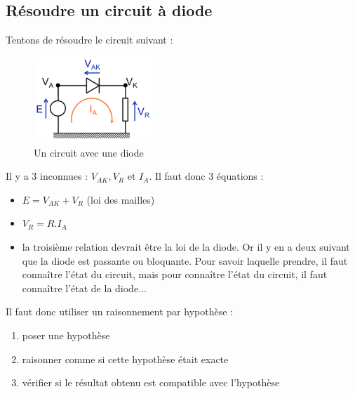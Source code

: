 \documentclass[a4paper]{article}
\begin{document}
    \subsection{Résoudre un circuit à diode}
    Tentons de résoudre le circuit suivant :
    \begin{figure}[H]
        \begin{center}
            \includegraphics[width=0.4\textwidth]{fig/5_circuitdiode.png}
            \caption{Un circuit avec une diode}
            \label{fig:5_circuitdiode}
        \end{center}
    \end{figure}
    Il y a 3 inconnues : $V_{AK}, V_R$ et $I_A$. Il faut donc 3 équations :
    \begin{itemize}
        \item $E = V_{AK}+V_R$ (loi des mailles)
        \item $V_R = R.I_A$
        \item la troisième relation devrait être la loi de la diode. Or il y en a 
        deux suivant que la diode est passante ou bloquante. Pour savoir laquelle
        prendre, il faut connaître l'état du circuit, mais pour connaître l'état
        du circuit, il faut connaître l'état de la diode...
    \end{itemize}

    Il faut donc utiliser un raisonnement par hypothèse :
    \begin{enumerate}
        \item poser une hypothèse
        \item raisonner comme si cette hypothèse était exacte
        \item vérifier si le résultat obtenu est compatible avec l'hypothèse
    \end{enumerate}
\end{document}
